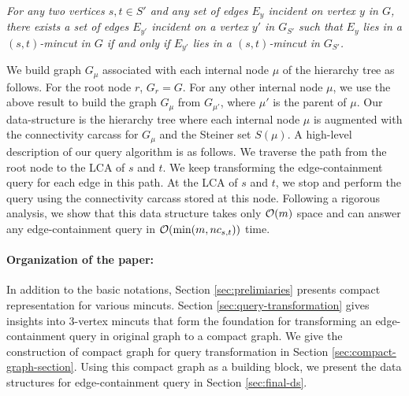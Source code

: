{\em
For any two vertices $s,t \in S'$ and any set of edges $E_y$ incident on vertex $y$ in $G$, there exists a set of edges $E_{y'}$ incident on a vertex $y'$ in $G_{S'}$ such that $E_y$ lies in a $(s,t)$-mincut in $G$ if and only if $E_{y'}$ lies in a $(s,t)$-mincut in $G_{S'}$. 
}

We build graph $G_\mu$ associated with each internal node $\mu$ of the hierarchy tree as follows. For the root node $r$, $G_r = G$. For any other internal node $\mu$, we use the above result to build the graph $G_{\mu}$ from $G_{\mu'}$, where $\mu'$ is the parent of $\mu$. 
Our data-structure is the hierarchy tree where each internal node $\mu$ is augmented with the connectivity carcass for $G_\mu$ and the Steiner set $S(\mu)$. A high-level description of our query algorithm is as follows. 
We traverse the path from the root node to the LCA of $s$ and $t$.
We keep transforming the edge-containment query for each edge in this path.
At the LCA of $s$ and $t$, we stop and perform the query using the connectivity carcass 
stored at this node.
Following a rigorous analysis, we show that this data structure takes only ${\cal O}(m)$ space and can answer any edge-containment query in ${\cal O}(\min(m,nc_{s,t}))$ time.

\paragraph{Organization of the paper:}

In addition to the basic notations, Section \ref{sec:prelimiaries} presents compact representation for various mincuts. Section \ref{sec:query-transformation} gives insights into $3$-vertex mincuts that form the foundation for transforming an edge-containment query in original graph to a compact graph. We give the construction of compact graph for query transformation in Section \ref{sec:compact-graph-section}.
Using this compact graph as a building block, we present the data structures for edge-containment query in Section \ref{sec:final-ds}.